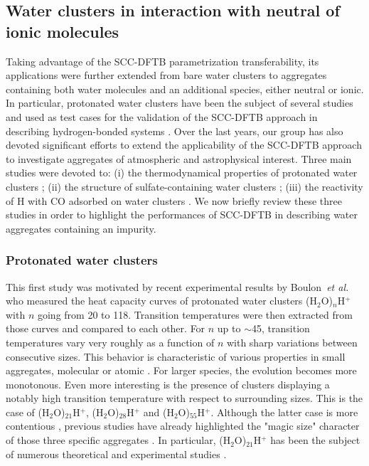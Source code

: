 \documentclass[]{interact}
\theoremstyle{plain}%
\theoremstyle{definition}
\theoremstyle{remark}
\begin{document}

\subsection{Water clusters in interaction with neutral of ionic molecules}

Taking advantage of the SCC-DFTB parametrization transferability, its applications were further extended 
from bare water clusters to aggregates containing both water molecules and an additional species, either
neutral or ionic. In particular, protonated water clusters have been the subject of several studies and used
as test cases for the validation of the SCC-DFTB approach in describing hydrogen-bonded systems \cite{Yu2007,Goyal2011,Dominguez2015}.
Over the last years, our group has also devoted significant efforts to extend the applicability of the
SCC-DFTB approach to investigate aggregates of atmospheric and astrophysical interest. Three main studies
were devoted to:  (i) the thermodynamical properties of protonated water clusters \cite{Korchagina2017} ; (ii)
the structure of sulfate-containing water clusters \cite{Korchagina2016} ; (iii) the reactivity of H with CO adsorbed on water clusters \cite{Korchagina2017a}.
We now briefly review these three studies in order to highlight the performances of SCC-DFTB in describing
water aggregates containing an impurity.


\subsubsection{Protonated water clusters} 

This first study was motivated by recent experimental results by Boulon~\textit{et al.}
\cite{Boulon2014}  who measured the heat capacity curves of protonated water clusters (H$_{2}$O)$_{n}$H$^{+}$ with $n$ going
from 20 to 118. Transition temperatures were then extracted from those curves and compared to each other. For $n$ up to $\sim$45,
transition temperatures vary very roughly as a function of $n$ with sharp variations between consecutive sizes. This behavior is
characteristic of various properties in small aggregates, molecular or atomic \cite{Jortner1992,Labastie_book}. For larger species,
the evolution becomes more monotonous. Even more interesting is the presence of  clusters displaying a notably high transition
temperature with respect to surrounding sizes. This is the case of  (H$_{2}$O)$_{21}$H$^{+}$, (H$_{2}$O)$_{28}$H$^{+}$ and
(H$_{2}$O)$_{55}$H$^{+}$. Although the latter case is more contentious \cite{Hansen2009}, previous studies have already highlighted
the "magic size" character of those three specific aggregates \cite{Lee1998,Shin2004,Wu2005,Hansen2009}. In particular,
(H$_{2}$O)$_{21}$H$^{+}$ has been the subject of numerous theoretical and experimental studies \cite{Hodges2000,Wu2005,Iyengar2005,Miyazaki2004,Shin2004,Singh2006}.
\end{document}
